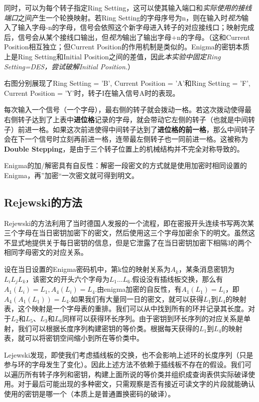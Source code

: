 \documentclass[a4paper,12pt]{article}
\begin{document}
	
	同时，可以为每个转子指定Ring Setting，这可以使其输入端口和\textit{实际使用的接线端口}之间产生一个轮换映射。若Ring Setting的字母序号为n，则在输入时\textit{视为}输入了输入字母-n的字母，信号会依照这个新字母进入转子的对应接线口；映射完成后，信号会从某个接线口输出，但\textit{视为}输出了输出字母+n的字母。（这和Current Position相互独立；但Current Position的作用机制是类似的。Enigma的密钥本质上是Ring Setting和Initial Position之间的差值，因此\textit{本实验中固定Ring Setting=DES，尝试破解Initial Position.}）
		
	右图分别展现了Ring Setting = 'B', Current Position = 'A'和Ring Setting = 'F', Current Position = 'Y'时，转子I在输入信号A时的表现。
	
	每次输入一个信号（一个字母），最右侧的转子就会拨动一格。若这次拨动使得最右侧转子达到了上表中\textbf{进位格}记录的字母，就会带动它左侧的转子（也就是中间转子）前进一格。如果这次前进使得中间转子达到了\textbf{进位格的前一格}，那么中间转子会在下一个信号时立刻再前进一格，连带最左侧转子也一同前进一格。这被称为\textbf{Double Stepping}，是由于三个转子位置上的机械结构并不完全对称导致的。
	
	Enigma的加/解密具有自反性：解密一段密文的方式就是使用加密时相同设置的Enigma，再”加密“一次密文就可得到明文。
	
	\subsection{Rejewski的方法}
	
	Rejewski的方法利用了当时德国人发报的一个流程，即在密报开头连续书写两次某三个字母在当日密钥加密下的密文，然后使用这三个字母加密余下的明文。虽然这不显式地提供关于每日密钥的信息，但是它泄露了在当日密钥加密下相隔3的两个相同字母密文的对应关系。
	
	设在当日设置的Enigma密码机中，第k位的映射关系为$A_k$，某条消息密钥为$L_iL_jL_k$，该密文的开头六个字母为$L_1\dots L_6$.假设没有插线板交换，那么有$A_1(L_i) = L_1, A_4(L_i) = L_4$.由enigma加密的自反性，有$A_1(L_1) = L_i$，即$A_4(A_1(L_1)) = L_4$.如果我们有大量同一日的密文，就可以获得$L_1$到$L_4$的映射表，这个映射是一个字母表的重排。我们可以从中找到所有的环并记录其长度。对于$L_2$和$L_5$、$L_3$和$L_6$同样可以获得环长序列。由于密钥到环长序列的对应关系是单射，我们可以根据长度序列构建密钥的等价类。根据每天获得的$L_1$到$L_4$的映射表，就可以将密钥空间缩小到所在等价类中。
	
	Lejewski发现，即使我们考虑插线板的交换，也不会影响上述环的长度序列（只是参与环的字母发生了变化）。因此上述方法不依赖于插线板不存在的假设。我们可以遍历所有转子序列和密钥，构建上面所说的等价类并组织成查询表供实际破译使用。对于最后可能出现的多种密文，只需观察是否有接近可读文字的片段就能确认使用的密钥是哪一个（本质上是普通置换密码的破译）。
	
\end{document}

